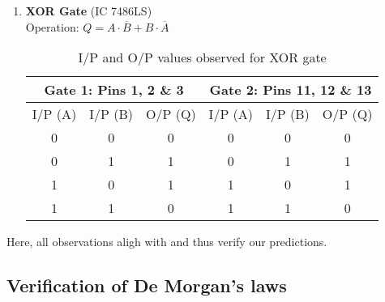 \begin{enumerate}
    \item \textbf{XOR Gate} (IC 7486LS)\\
    Operation: $Q=A \cdot \overline{B} + B \cdot \overline{A}$
        \begin{table}[H]
            \centering
            \begin{tabular}{|c|c|c|c|c|c|}\hline
            \multicolumn{3}{|c|}{\textbf{Gate 1: Pins 1, 2 \& 3}} & \multicolumn{3}{c|}{\textbf{Gate 2: Pins 11, 12 \& 13}} \\ \hline
            I/P (A) & I/P (B) & O/P (Q) & I/P (A) & I/P (B) & O/P (Q) \\ \hline
            0 & 0 & 0 & 0 & 0 & 0 \\ 
            0 & 1 & 1 & 0 & 1 & 1 \\ 
            1 & 0 & 1 & 1 & 0 & 1  \\ 
            1 & 1 & 0 & 1 & 1 & 0 \\ \hline
            \end{tabular}
            \caption{I/P and O/P values observed for XOR gate}
        \end{table}

\end{enumerate}
Here, all observations aligh with and thus verify  our predictions.

\subsection*{Verification of De Morgan's laws}

